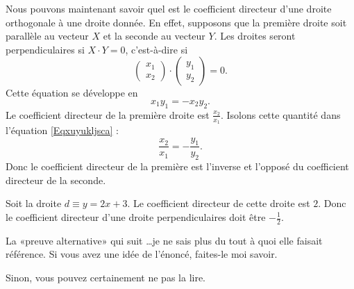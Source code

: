 Nous pouvons maintenant savoir quel est le coefficient directeur d'une droite orthogonale à une droite donnée. En effet, supposons que la première droite soit parallèle au vecteur \( X\) et la seconde au vecteur \( Y\). Les droites seront perpendiculaires si \( X\cdot Y=0\), c'est-à-dire si
\begin{equation}
	\begin{pmatrix}
		x_1 \\
		x_2
	\end{pmatrix}\cdot\begin{pmatrix}
		y_1 \\
		y_2
	\end{pmatrix}=0.
\end{equation}
Cette équation se développe en
\begin{equation}    \label{Eqxuyukljsca}
	x_1y_1=-x_2y_2.
\end{equation}
Le coefficient directeur de la première droite est \( \frac{ x_2 }{ x_1 }\). Isolons cette quantité dans l'équation \eqref{Eqxuyukljsca} :
\begin{equation}
	\frac{ x_2 }{ x_1 }=-\frac{ y_1 }{ y_2 }.
\end{equation}
Donc le coefficient directeur de la première est l'inverse et l'opposé du coefficient directeur de la seconde.

\begin{example}
	Soit la droite \( d\equiv y=2x+3\). Le coefficient directeur de cette droite est \( 2\). Donc le coefficient directeur d'une droite perpendiculaires doit être \( -\frac{ 1 }{ 2 }\).
\end{example}


\begin{probleme}		\label{PROBooLOEKooZxNpJZ}
	La «preuve alternative» qui suit \ldots je ne sais plus du tout à quoi elle faisait référence. Si vous avez une idée de l'énoncé, faites-le moi savoir.

	Sinon, vous pouvez certainement ne pas la lire.
\end{probleme}

